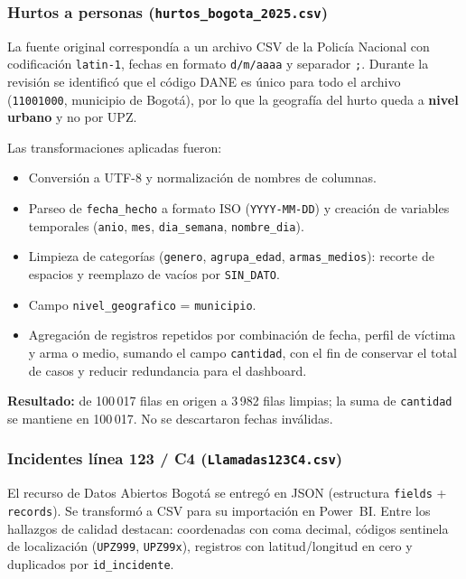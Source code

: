 \documentclass[12pt,letterpaper]{article}
\begin{document}
\subsubsection{Hurtos a personas (\texttt{hurtos\_bogota\_2025.csv})}

La fuente original correspondía a un archivo CSV de la Policía Nacional con codificación \texttt{latin-1}, fechas en formato \texttt{d/m/aaaa} y separador \texttt{;}. Durante la revisión se identificó que el código DANE es único para todo el archivo (\texttt{11001000}, municipio de Bogotá), por lo que la geografía del hurto queda a \textbf{nivel urbano} y no por UPZ.

Las transformaciones aplicadas fueron:
\begin{itemize}[noitemsep, topsep=0pt]
    \item Conversión a UTF-8 y normalización de nombres de columnas.
    \item Parseo de \texttt{fecha\_hecho} a formato ISO (\texttt{YYYY-MM-DD}) y creación de variables temporales (\texttt{anio}, \texttt{mes}, \texttt{dia\_semana}, \texttt{nombre\_dia}).
    \item Limpieza de categorías (\texttt{genero}, \texttt{agrupa\_edad}, \texttt{armas\_medios}): recorte de espacios y reemplazo de vacíos por \texttt{SIN\_DATO}.
    \item Campo \texttt{nivel\_geografico} = \texttt{municipio}.
    \item Agregación de registros repetidos por combinación de fecha, perfil de víctima y arma o medio, sumando el campo \texttt{cantidad}, con el fin de conservar el total de casos y reducir redundancia para el dashboard.
\end{itemize}

\textbf{Resultado:} de 100\,017 filas en origen a 3\,982 filas limpias; la suma de \texttt{cantidad} se mantiene en 100\,017. No se descartaron fechas inválidas.

\subsubsection{Incidentes línea 123 / C4 (\texttt{Llamadas123C4.csv})}

El recurso de Datos Abiertos Bogotá se entregó en JSON (estructura \texttt{fields} + \texttt{records}). Se transformó a CSV para su importación en Power~BI. Entre los hallazgos de calidad destacan: coordenadas con coma decimal, códigos sentinela de localización (\texttt{UPZ999}, \texttt{UPZ99x}), registros con latitud/longitud en cero y duplicados por \texttt{id\_incidente}.
\end{document}
